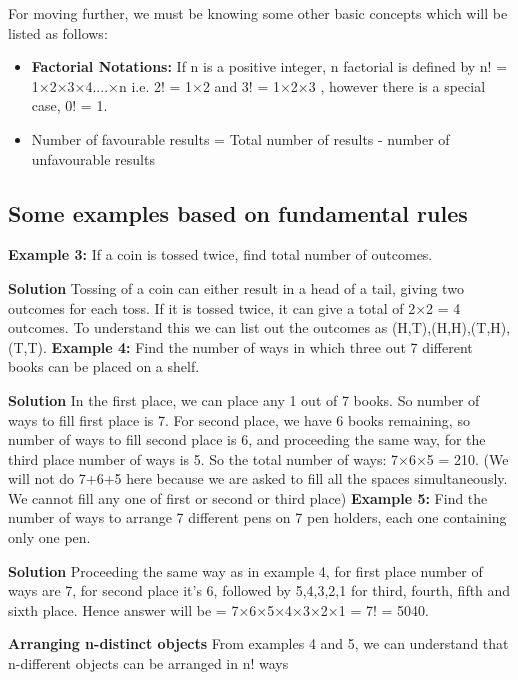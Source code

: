 \documentclass[12pt, a4paper]{article}
\begin{document}
For moving further, we must be knowing some other basic concepts which will be listed as follows:
\begin{itemize}
    \item \textbf{Factorial Notations:} If n is a positive integer, n factorial is defined by n! = 1×2×3×4....×n i.e. 2! = 1×2 and 3! = 1×2×3 , however there is a special case, 0! = 1.
    \item Number of favourable results = Total number of results - number of unfavourable results
\end{itemize}

\newpage
\subsection{Some examples based on fundamental rules}
\textbf{Example 3:} If a coin is tossed twice, find total number of outcomes.

\textbf{Solution} Tossing of a coin can either result in a head of a tail, giving two outcomes for each toss. If it is tossed twice, it can give a total of 2×2 = 4 outcomes. To understand this we can list out the outcomes as {(H,T),(H,H),(T,H),(T,T)}.\newline
\textbf{Example 4:} Find the number of ways in which three out 7 different books can be placed on a shelf.

\textbf{Solution} In the first place, we can place any 1 out of 7 books. So number of ways to fill first place is 7. For second place, we have 6 books remaining, so number of ways to fill second place is 6, and proceeding the same way, for the third place number of ways is 5. So the total number of ways: 7×6×5 = 210. (We will not do 7+6+5 here because we are asked to fill all the spaces simultaneously. We cannot fill any one of first or second or third place)\newline
\textbf{Example 5:} Find the number of ways to arrange 7 different pens on 7 pen holders, each one containing only one pen.

\textbf{Solution} Proceeding the same way as in example 4, for first place number of ways are 7, for second place it's 6, followed by 5,4,3,2,1 for third, fourth, fifth and sixth place. Hence answer will be = 7×6×5×4×3×2×1 = 7! = 5040. 
\begin{tcolorbox}[colback=TealBlue!10!White,colframe=TealBlue!50!black]
\textbf{Arranging n-distinct objects}
From examples 4 and 5, we can understand that n-different objects can be arranged in n! ways
\end{tcolorbox}
\end{document}
